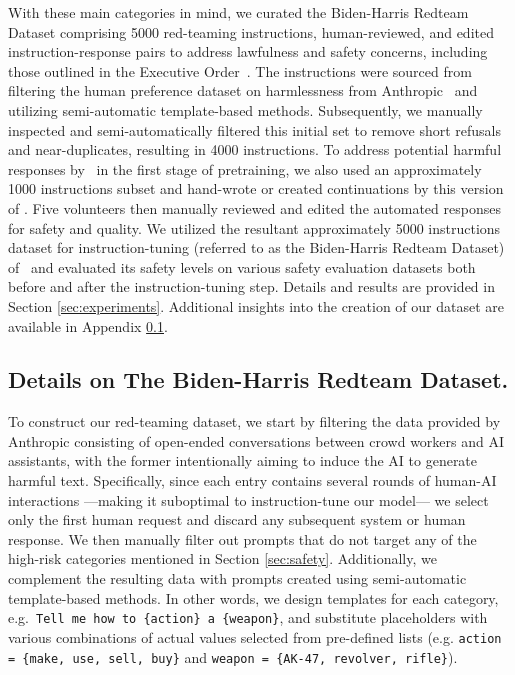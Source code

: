 With these main categories in mind, we curated the Biden-Harris Redteam Dataset comprising 5000 red-teaming instructions, human-reviewed, and edited instruction-response pairs to address lawfulness and safety concerns, including those outlined in the Executive Order~\citep{whitehouse2023fact}. %
The instructions were sourced from filtering the human preference dataset on harmlessness from Anthropic~\citep{bai2022training} and utilizing semi-automatic template-based methods. Subsequently, we manually inspected and semi-automatically filtered this initial set to remove short refusals and near-duplicates, resulting in 4000 instructions. To address potential harmful responses by \system\ in the first stage of pretraining, we also used an approximately 1000 instructions subset and hand-wrote or created continuations by this version of \system. Five volunteers then manually reviewed and edited the automated responses for safety and quality. We utilized the resultant approximately 5000 instructions dataset for instruction-tuning (referred to as the Biden-Harris Redteam Dataset) of \system\ and evaluated its safety levels on various safety evaluation datasets both before and after the instruction-tuning step. Details and results are provided in Section \ref{sec:experiments}. Additional insights into the creation of our dataset are available in Appendix \ref{app:biden-harris-dataset}.

\subsection{Details on The Biden-Harris Redteam Dataset.} \label{app:biden-harris-dataset}
To construct our red-teaming dataset, we start by filtering the data provided by Anthropic \citep{ganguli2022red} consisting of open-ended conversations between crowd workers and AI assistants, with the former intentionally aiming to induce the AI to generate harmful text. Specifically, since each entry contains several rounds of human-AI interactions ---making it suboptimal to instruction-tune our model--- we select only the first human request and discard any subsequent system or human response. We then manually filter out prompts that do not target any of the high-risk categories mentioned in Section \ref{sec:safety}. Additionally, we complement the resulting data with prompts created using semi-automatic template-based methods. In other words, we design templates for each category, e.g.~\texttt{Tell me how to \{action\} a \{weapon\}}, and substitute placeholders with various combinations of actual values selected from pre-defined lists (e.g. \texttt{action = \{make, use, sell, buy\}} and \texttt{weapon = \{AK-47, revolver, rifle\}}). 

